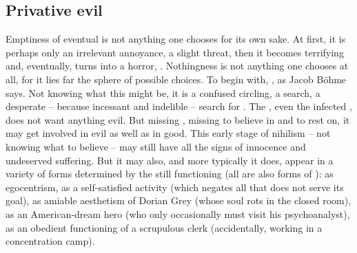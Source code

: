 \subsection{Privative evil}\label{sub:privativum}
\pa Emptiness of eventual  is not anything one chooses for its
own sake. At first, it is perhaps only an irrelevant annoyance, a slight threat,
then it becomes terrifying and, eventually, turns into a horror, .
Nothingness is not anything one chooses at all, for it lies far  the
sphere of possible  choices. To begin with, , as Jacob B\"{o}hme says.  Not knowing what this
 might be, it is a confused circling, a search, a desperate --
because incessant and indelible -- search for .  The ,
even the infected , does not want anything evil. But missing
, missing  to believe in and to rest on, it may
get involved in evil as well as in good. This early stage of nihilism -- not
knowing what to believe
-- may still have all the 
signs of innocence and undeserved suffering. But it may also, and more typically
it does, appear in a variety of forms determined by the still functioning
 (all  are also forms of ): as egocentrism, as
a self-satisfied activity (which negates all that does not serve its goal), as
amiable aesthetism of Dorian Grey (whose soul rots in the closed room), as an 
American-dream hero (who only occasionally must visit his psychoanalyst), as an
obedient functioning of a scrupulous clerk (accidentally, working in a
concentration camp).

